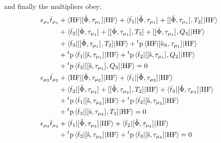 and finally the multipliers obey:
\begin{subequations}\label{eq:pted-cc3-multipliers}
  \begin{align}
    \epsilon_{\mu_1}\bar{t}_{\mu_1} &+
     \braket{\mathrm{HF} | [ \check{\Phi}, \tau_{\mu_1} ]^{} | \mathrm{HF}}
   + \braket{\bar{t}_{1} |
       [ \check{\Phi}, \tau_{\mu_1} ]^{}
     + [ [ \check{\Phi}, \tau_{\mu_1} ]^{}, T_2 ]^{}
     | \mathrm{HF}} \nonumber \\
   &+ \braket{\bar{t}_{2} |
       [ \check{\Phi}, \tau_{\mu_1} ]^{}
     + [ [ \check{\Phi}, \tau_{\mu_1} ]^{}, T_2 ]^{}
     + [ [ \check{\Phi}, \tau_{\mu_1} ]^{}, Q_3 ]^{}
   | \mathrm{HF}} \nonumber \\
   &+ \braket{\bar{t}_{3} |
      [ [ \check{\Phi}, \tau_{\mu_1} ]^{}, T_2 ]^{}
     | \mathrm{HF}}
   + {}^t\mathrm{p}\braket{\mathrm{HF} |
   [ \check{\mathrm{s}}_\mathrm{N}, \tau_{\mu_1} ]^{} | \mathrm{HF}}  \nonumber \\
   &+ {}^t\mathrm{p}\braket{\bar{t}_{1} | [ \check{\mathrm{s}}, \tau_{\mu_1} ]^{} | \mathrm{HF}}
   + {}^t\mathrm{p}\braket{\bar{t}_{2} |
   [ [ \check{\mathrm{s}}, \tau_{\mu_1} ]^{}, Q_2 ]^{} |
   \mathrm{HF}} \nonumber \\
   &+ {}^t\mathrm{p}\braket{\bar{t}_{3} | [ [ \check{\mathrm{s}}, \tau_{\mu_1} ]^{}, Q_3 ]^{} | \mathrm{HF}}
     = 0 \label{eq:pted-cc3-singles-multipliers} \\
    \epsilon_{\mu_2}\bar{t}_{\mu_2} &+
    \braket{\mathrm{HF} | [ \check{\Phi}, \tau_{\mu_2} ]^{} | \mathrm{HF}}
   + \braket{\bar{t}_{1} |
       [ \check{\Phi}, \tau_{\mu_2} ]^{}
     | \mathrm{HF}} \nonumber \\
  &+ \braket{\bar{t}_{2} |
       [ \check{\Phi}, \tau_{\mu_2} ]^{}
     + [ [ \check{\Phi}, \tau_{\mu_2} ]^{}, T_2 ]^{}
     | \mathrm{HF}}
  + \braket{\bar{t}_{3} |
       [ \check{\Phi}, \tau_{\mu_2} ]^{}
     | \mathrm{HF}} \nonumber \\
   &+ {}^t\mathrm{p}\braket{\bar{t}_{1} | [ \check{\mathrm{s}}, \tau_{\mu_2} ]^{} | \mathrm{HF}}
   + {}^t\mathrm{p}\braket{\bar{t}_{2} | [ \check{\mathrm{s}}, \tau_{\mu_2} ]^{} | \mathrm{HF}}
   \nonumber \\
   &+ {}^t\mathrm{p}\braket{\bar{t}_{3} |
   [ [ \check{\mathrm{s}}, \tau_{\mu_2} ]^{}, T_2 ]^{} | \mathrm{HF}}
    = 0 \label{eq:pted-cc3-doubles-multipliers} \\
    \epsilon_{\mu_3}\bar{t}_{\mu_3} &+
    \braket{\bar{t}_{1} |
       [ \check{\Phi}, \tau_{\mu_3} ]^{}
     | \mathrm{HF}}
  + \braket{\bar{t}_{2} |
       [ \check{\Phi}, \tau_{\mu_3} ]^{}
     | \mathrm{HF}} \nonumber \\
   &+ {}^t\mathrm{p}\braket{\bar{t}_{2} | [ \check{\mathrm{s}}, \tau_{\mu_3} ]^{} | \mathrm{HF}}
   + {}^t\mathrm{p}\braket{\bar{t}_{3} | [ \check{\mathrm{s}}, \tau_{\mu_3} ]^{} | \mathrm{HF}}
    = 0 \label{eq:pted-cc3-triples-multipliers}
  \end{align}
\end{subequations}

